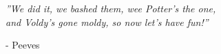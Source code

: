 \clearpage
\pagestyle{empty}  %

\null\vfill\vfill



\textit{
    ''We did it, we bashed them, wee Potter’s the one, \\
    and Voldy’s gone moldy, so now let’s have fun!''
}
\begin{flushright}
    - Peeves
\end{flushright}


 
\vfill\vfill\vfill\vfill\vfill\null
